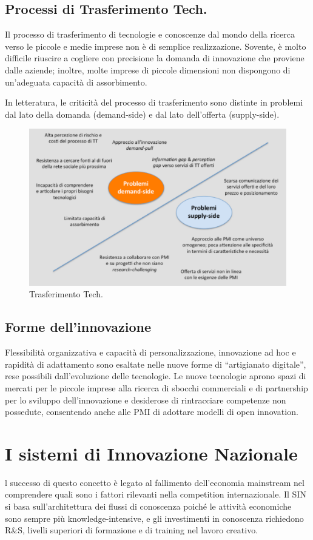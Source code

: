 \documentclass{article}
\begin{document}
\subsection{Processi di Trasferimento Tech.}
Il processo di trasferimento di tecnologie e conoscenze dal mondo della ricerca
verso le piccole e medie imprese non è di semplice realizzazione.
Sovente, è molto difficile riuscire a cogliere con precisione la domanda di
innovazione che proviene dalle aziende; inoltre, molte imprese di piccole
dimensioni non dispongono di un’adeguata capacità di assorbimento.

In letteratura, le criticità del processo di trasferimento sono
distinte in problemi dal lato della domanda (demand-side) e dal lato
dell’offerta (supply-side).


\begin{figure}[h!]
	\centering
	\includegraphics[scale=0.3]{images/ttf.png}
	\caption{Trasferimento Tech.}
	\label{fig:ttf}
\end{figure} 


\subsection{Forme dell'innovazione}
Flessibilità organizzativa e capacità di personalizzazione,
innovazione ad hoc e rapidità di adattamento sono esaltate nelle
nuove forme di “artigianato digitale”, rese possibili
dall’evoluzione delle tecnologie.
Le nuove tecnologie aprono spazi di mercati per le piccole
imprese alla ricerca di sbocchi commerciali e di partnership per lo
sviluppo dell’innovazione e desiderose di rintracciare competenze
non possedute, consentendo anche alle PMI di adottare modelli di
open innovation.


\section{I sistemi di Innovazione Nazionale }
l successo di questo concetto è legato al fallimento dell’economia
mainstream nel comprendere quali sono i fattori rilevanti nella
competition internazionale.
Il SIN si basa sull’architettura dei flussi di conoscenza poiché le
attività economiche sono sempre più knowledge-intensive, e gli
investimenti in conoscenza richiedono R\&S, livelli superiori di
formazione e di training nel lavoro creativo.
\end{document}
